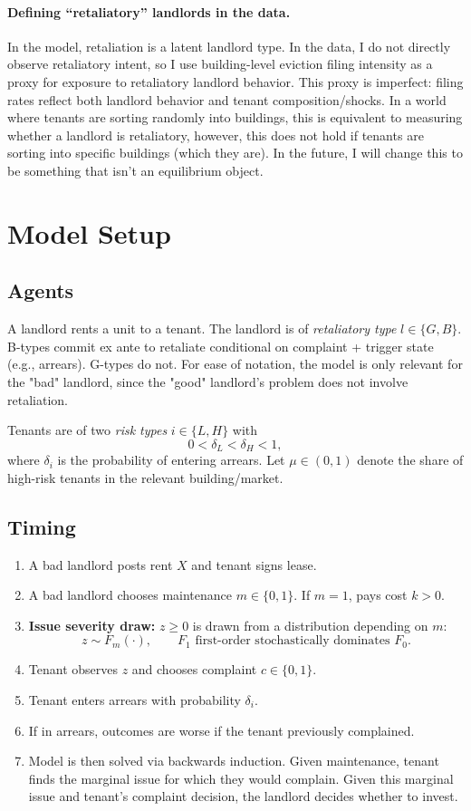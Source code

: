 \documentclass[11pt]{article}
\begin{document}
\paragraph{Defining ``retaliatory'' landlords in the data.}
In the model, retaliation is a latent landlord type. In the data, I do not directly observe retaliatory intent, so I use building-level eviction filing intensity as a proxy for exposure to retaliatory landlord behavior. This proxy is imperfect: filing rates reflect both landlord behavior and tenant composition/shocks. In a world where tenants are sorting randomly into buildings, this is equivalent to measuring whether a landlord is retaliatory, however, this does not hold if tenants are sorting into specific buildings (which they are). In the future, I will change this to be something that isn't an equilibrium object. 

\clearpage
\section{Model Setup}

\subsection{Agents}
A landlord rents a unit to a tenant. The landlord is of \emph{retaliatory type} $l \in \{G,B\}$. B-types commit ex ante to retaliate conditional on complaint + trigger state (e.g., arrears). G-types do not. For ease of notation, the model is only relevant for the "bad" landlord, since the "good" landlord's problem does not involve retaliation. 

Tenants are of two \emph{risk types} $i\in\{L,H\}$ with
\[
0<\delta_L<\delta_H<1,
\]
where $\delta_i$ is the probability of entering arrears. Let $\mu\in(0,1)$ denote the share of high-risk tenants in the relevant building/market.

\subsection{Timing}
\begin{enumerate}
  \item A bad landlord posts rent $X$ and tenant signs lease.
  \item A bad landlord chooses maintenance $m\in\{0,1\}$. If $m=1$, pays cost $k>0$.
  \item \textbf{Issue severity draw:} $z\ge 0$ is drawn from a distribution depending on $m$:
  \[
  z\sim F_m(\cdot),
  \qquad
  F_1 \text{ first-order stochastically dominates } F_0.
  \]
  \item Tenant observes $z$ and chooses complaint $c\in\{0,1\}$.
  \item Tenant enters arrears with probability $\delta_i$.
  \item If in arrears, outcomes are worse if the tenant previously complained.
  \item Model is then solved via backwards induction. Given maintenance, tenant finds the marginal issue for which they would complain. Given this marginal issue and tenant's complaint decision, the landlord decides whether to invest.
\end{enumerate}
\end{document}
